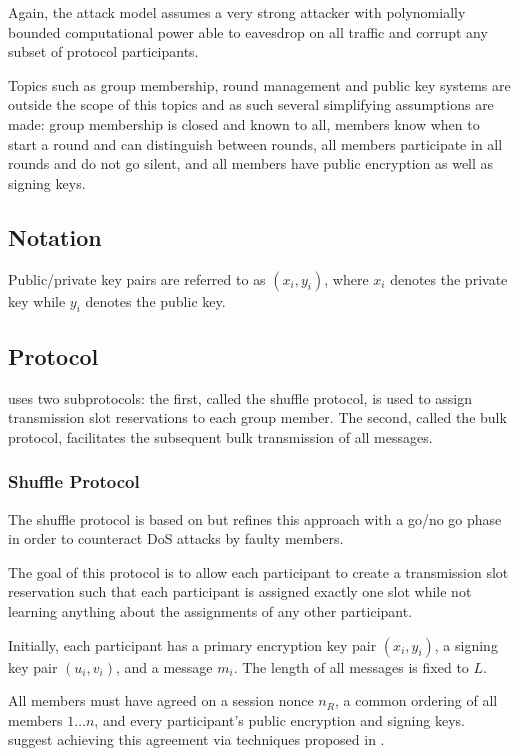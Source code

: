 Again, the attack model assumes a very strong attacker with polynomially bounded computational
power able to eavesdrop on all traffic and corrupt any subset of protocol participants.

Topics such as group membership, round management and public key systems are outside
the scope of this topics and as such several simplifying assumptions are made: group membership is closed
and known to all, members
know when to start a round and can distinguish between rounds, all members participate in all rounds
and do not go silent, and all members have public encryption as well as signing keys.

\subsection{Notation}

Public/private key pairs are referred to as $(x_i, y_i)$, where $x_i$ denotes the private
key while $y_i$ denotes the public key.

\subsection{Protocol}

\Dissent uses two subprotocols: the first, called the shuffle protocol, is used to assign
transmission slot reservations to each group member. The second, called the bulk protocol,
facilitates the subsequent bulk transmission of all messages.

\subsubsection{Shuffle Protocol}

The shuffle protocol is based on \cite{brickell2006efficient} but refines this approach
with a go/no go phase in order to counteract \ac{DoS} attacks by faulty members.

The goal of this protocol is to allow each participant to create a transmission slot reservation
such that each participant is assigned exactly one slot while not learning anything about
the assignments of any other participant.

Initially, each participant has a primary encryption key pair $(x_i, y_i)$, a signing key pair
$(u_i, v_i)$, and a message $m_i$. The length of all messages is fixed to $L$.


All members must have agreed on a session nonce $n_R$, a common ordering of all members
$1 \ldots n$, and every participant's public encryption and signing keys. \citeauthor{journals/corr/abs-1004-3057} suggest achieving this agreement via techniques
proposed in \cite{lamport1998part,castro1999practical}.

